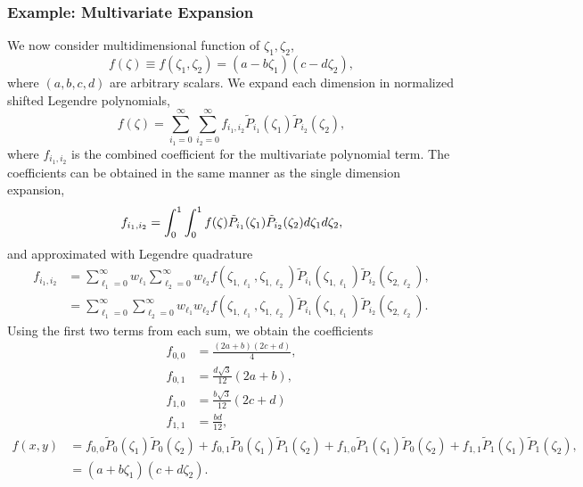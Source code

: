 \newpage
\subsubsection{Example: Multivariate Expansion}
We now consider multidimensional function of $\zeta_1,\zeta_2$,
\begin{equation}
f(\zeta)\equiv f(\zeta_1,\zeta_2)=(a-b\zeta_1)(c-d\zeta_2),
\end{equation}
where $(a,b,c,d)$ are arbitrary scalars.  We expand each dimension in normalized shifted Legendre polynomials,
\begin{equation}
f(\zeta)=\sum_{i_1=0}^\infty \sum_{i_2=0}^\infty f_{i_1,i_2}\tilde P_{i_1}(\zeta_1)\tilde P_{i_2}(\zeta_2),
\end{equation}
where $f_{i_1,i_2}$ is the combined coefficient for the multivariate polynomial term.  The coefficients can be obtained in the same manner as the single dimension expansion,
\begin{equation}
f_{i_1,i_2}=\int_0^1\int_0^1 f(\zeta)\tilde P_{i_1}(\zeta_1)\tilde P_{i_2}(\zeta_2)d\zeta_1d\zeta_2,
\end{equation}
and approximated with Legendre quadrature
\begin{align}
f_{i_1,i_2}&=\sum_{\ell_1=0}^\infty w_{\ell_1} \sum_{\ell_2=0}^\infty w_{\ell_2}
     f(\zeta_{1,\ell_1},\zeta_{1,\ell_2})\tilde P_{i_1}(\zeta_{1,\ell_1})\tilde P_{i_2}(\zeta_{2,\ell_2}),\\
  &=\sum_{\ell_1=0}^\infty \sum_{\ell_2=0}^\infty w_{\ell_1}w_{\ell_2}
     f(\zeta_{1,\ell_1},\zeta_{1,\ell_2})\tilde P_{i_1}(\zeta_{1,\ell_1})\tilde P_{i_2}(\zeta_{2,\ell_2}).
\end{align}
Using the first two terms from each sum, we obtain the coefficients
\begin{align}
f_{0,0}&=\frac{(2a+b)(2c+d)}{4},\\
f_{0,1}&= \frac{d\sqrt{3}}{12}(2a+b), \\
f_{1,0}&=\frac{b\sqrt{3}}{12}(2c+d) \\
f_{1,1}&=\frac{bd}{12},
\end{align}
\begin{align}
f(x,y)&=f_{0,0}\tilde P_0(\zeta_1)\tilde P_0(\zeta_2) +
f_{0,1}\tilde P_0(\zeta_1)\tilde P_1(\zeta_2) +
f_{1,0}\tilde P_1(\zeta_1)\tilde P_0(\zeta_2) +
f_{1,1}\tilde P_1(\zeta_1)\tilde P_1(\zeta_2),\\
&=(a+b\zeta_1)(c+d\zeta_2).
\end{align}

